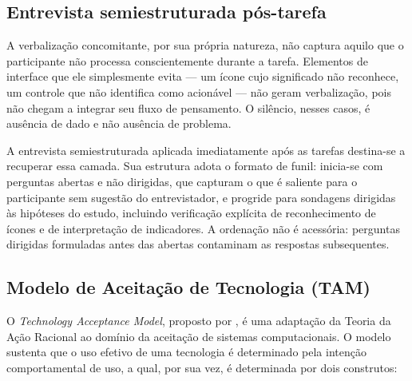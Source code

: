 %
%
%

\subsection{Entrevista semiestruturada pós-tarefa}
\label{sec:entrevista_teoria}

A verbalização concomitante, por sua própria natureza, não captura aquilo que o
participante não processa conscientemente durante a tarefa. Elementos de
interface que ele simplesmente evita --- um ícone cujo significado não reconhece,
um controle que não identifica como acionável --- não geram verbalização, pois não
chegam a integrar seu fluxo de pensamento. O silêncio, nesses casos, é ausência
de dado e não ausência de problema.

A entrevista semiestruturada aplicada imediatamente após as tarefas destina-se a
recuperar essa camada. Sua estrutura adota o formato de funil: inicia-se com
perguntas abertas e não dirigidas, que capturam o que é saliente para o
participante sem sugestão do entrevistador, e progride para sondagens dirigidas
às hipóteses do estudo, incluindo verificação explícita de reconhecimento de
ícones e de interpretação de indicadores. A ordenação não é acessória: perguntas
dirigidas formuladas antes das abertas contaminam as respostas subsequentes.

\subsection{Modelo de Aceitação de Tecnologia (TAM)}
\label{sec:tam_teoria}

O \textit{Technology Acceptance Model}, proposto por , é uma
adaptação da Teoria da Ação Racional ao domínio da aceitação de sistemas
computacionais. O modelo sustenta que o uso efetivo de uma tecnologia é
determinado pela intenção comportamental de uso, a qual, por sua vez, é
determinada por dois construtos:

